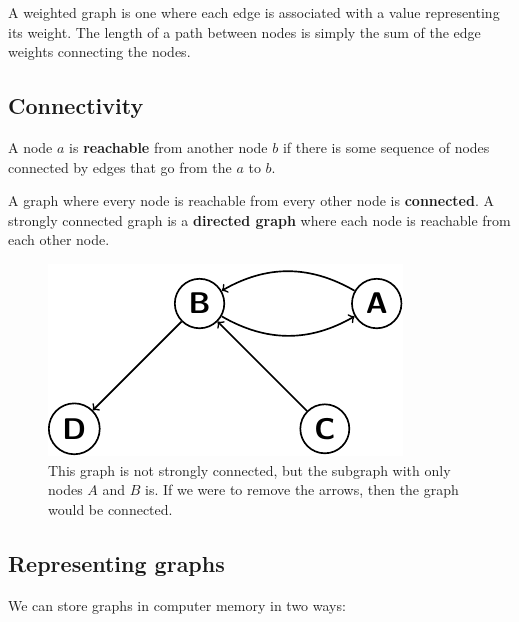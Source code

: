 A weighted graph is one where each edge is associated with a value representing
its weight. The length of a path between nodes is simply the sum of the edge
weights connecting the nodes.

\subsection{Connectivity}
\label{connectivity}

A node $a$ is \textbf{reachable} from another node $b$ if there is some sequence
of nodes connected by edges that go from the $a$ to $b$.

A graph where every node is reachable from every other node is
\textbf{connected}. A strongly connected graph is a \textbf{directed graph}
where each node is reachable from each other node.

\begin{figure}[h]
  \centering
  \includegraphics{diagrams/connected-graph}
  \caption{This graph is not strongly connected, but the subgraph with only
  nodes $A$ and $B$ is. If we were to remove the arrows, then the graph would
  be connected.}
  \label{fig:connected-graph}
\end{figure}

\subsection{Representing graphs}

We can store graphs in computer memory in two ways:


